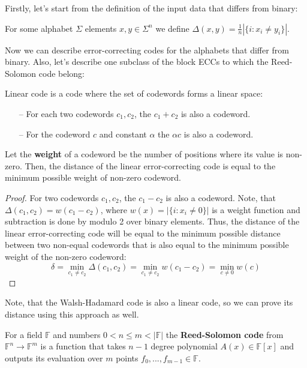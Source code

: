 \documentclass[../lecture-notes.tex]{subfiles}
\begin{document}
Firstly, let's start from the definition of the input data that differs from binary:
\begin{definition}
For some alphabet $\Sigma$ elements $x,y \in \Sigma^n$ we define $\Delta(x, y) = \frac{1}{n}|\{i: x_i \neq y_i\}|$.
\end{definition}
Now we can describe error-correcting codes for the alphabets that differ from binary. Also, let's describe one 
subclass of the block ECCs to which the Reed-Solomon code belong:
\begin{definition}
Linear code is a code where the set of codewords forms a linear space: 
\begin{itemize}
    \item[--] For each two codewords $c_1, c_2$, the $c_1 + c_2$ is also a codeword.
    \item[--] For the codeword $c$ and constant $\alpha$ the $\alpha c$ is also a codeword.
\end{itemize}
\end{definition}
\begin{theorem}
Let the \textbf{weight} of a codeword be the number of positions where its value is non-zero. Then, the distance of 
the linear error-correcting code is equal to the minimum possible weight of non-zero codeword.
\end{theorem}
\begin{proof}
For two codewords $c_1, c_2$, the $c_1 - c_2$ is also a codeword. Note, that $\Delta(c_1, c_2) = w(c_1-c_2)$, 
where $w(x) = |\{i: x_i \neq 0\}|$ is a weight function and subtraction is done by modulo 2 over binary elements. 
Thus, the distance of the linear error-correcting code will be equal to the minimum possible distance between two 
non-equal codewords that is also equal to the minimum possible weight of the non-zero codeword:
\begin{equation*}
    \delta = \min_{c_1 \neq c_2} \Delta(c_1, c_2) = \min_{c_1 \neq c_2} w(c_1 - c_2) = \min_{c \neq 0} w(c)
\end{equation*} 
\end{proof}
Note, that the Walsh-Hadamard code is also a linear code, so we can prove its distance using this approach as well.


\begin{definition}
For a field $\mathbb{F}$ and numbers $0 < n \leq m < |\mathbb{F}|$ the \textbf{Reed-Solomon code} from 
$\mathbb{F}^n \rightarrow \mathbb{F}^m$ is a function that takes $n-1$ degree polynomial $A(x) \in \mathbb{F}[x]$ 
and outputs its evaluation over $m$ points $f_0,...,f_{m-1} \in \mathbb{F}$.
\end{definition}
    
\end{document}
